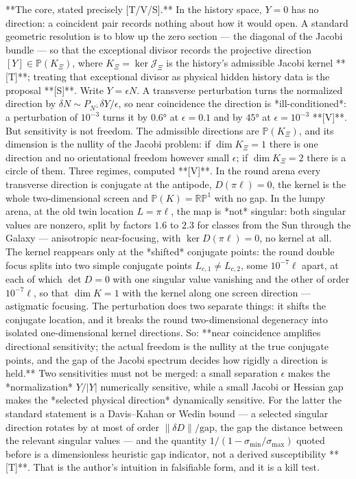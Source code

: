 **The core, stated precisely [T/V/S].** In the history space, $Y = 0$ has no direction: a coincident pair records nothing about how it would open. A standard geometric resolution is to blow up the zero section — the diagonal of the Jacobi bundle — so that the exceptional divisor records the projective direction $[Y]\in\mathbb P(K_\Xi)$, where $K_\Xi = \ker\mathcal J_\Xi$ is the history's admissible Jacobi kernel **[T]**; treating that exceptional divisor as physical hidden history data is the proposal **[S]**. Write $Y = \epsilon N$. A transverse perturbation turns the normalized direction by $\delta N\sim P_{N^\perp}\delta Y/\epsilon$, so near coincidence the direction is *ill-conditioned*: a perturbation of $10^{-3}$ turns it by $0.6°$ at $\epsilon = 0.1$ and by $45°$ at $\epsilon = 10^{-3}$ **[V]**. But sensitivity is not freedom. The admissible directions are $\mathbb P(K_\Xi)$, and its dimension is the nullity of the Jacobi problem: if $\dim K_\Xi = 1$ there is one direction and no orientational freedom however small $\epsilon$; if $\dim K_\Xi = 2$ there is a circle of them. Three regimes, computed **[V]**. In the round arena every transverse direction is conjugate at the antipode, $D(\pi\ell) = 0$, the kernel is the whole two-dimensional screen and $\mathbb P(K) = \mathbb{RP}^1$ with no gap. In the lumpy arena, at the old twin location $L = \pi\ell$, the map is *not* singular: both singular values are nonzero, split by factors $1.6$ to $2.3$ for classes from the Sun through the Galaxy — anisotropic near-focusing, with $\ker D(\pi\ell) = 0$, no kernel at all. The kernel reappears only at the *shifted* conjugate points: the round double focus splits into two simple conjugate points $L_{c,1}\neq L_{c,2}$, some $10^{-7}\ell$ apart, at each of which $\det D = 0$ with one singular value vanishing and the other of order $10^{-7}\ell$, so that $\dim K = 1$ with the kernel along one screen direction — astigmatic focusing. The perturbation does two separate things: it shifts the conjugate location, and it breaks the round two-dimensional degeneracy into isolated one-dimensional kernel directions. So: **near coincidence amplifies directional sensitivity; the actual freedom is the nullity at the true conjugate points, and the gap of the Jacobi spectrum decides how rigidly a direction is held.** Two sensitivities must not be merged: a small separation $\epsilon$ makes the *normalization* $Y/|Y|$ numerically sensitive, while a small Jacobi or Hessian gap makes the *selected physical direction* dynamically sensitive. For the latter the standard statement is a Davis–Kahan or Wedin bound — a selected singular direction rotates by at most of order $\|\delta D\|/\text{gap}$, the gap the distance between the relevant singular values — and the quantity $1/(1-\sigma_{\min}/\sigma_{\max})$ quoted before is a dimensionless heuristic gap indicator, not a derived susceptibility **[T]**. That is the author's intuition in falsifiable form, and it is a kill test.

